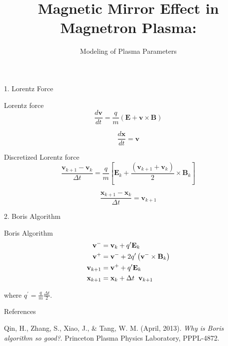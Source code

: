 \documentclass{beamer}
\title[]{Magnetic Mirror Effect in Magnetron Plasma:}
\subtitle{Modeling of Plasma Parameters}
\begin{document}
	
	\begin{frame}
		\titlepage	
	\end{frame}	
	
	\begin{frame}[t]{1. Lorentz Force }
	
	\begin{block}{Lorentz force}
		\begin{equation}
			\label{eqn:lorentz}
			\frac{d \textbf{v}}{d t} = \frac{q}{m} \left(\textbf{E} + \textbf{v} \times \textbf{B} \right)
		\end{equation}
	
	\end{block}
		\begin{equation}
			\label{eqn:velocity}
			\frac{d \textbf{x}}{d t} = \textbf{v}
		\end{equation}
	
	\begin{block}{Discretized Lorentz force}
		\begin{equation}
			\label{eqn:Dlorentz}
			\frac{\textbf{v}_{k+1} - \textbf{v}_{k}}{\Delta t} = \frac{q}{m} \left[\textbf{E}_{k} + \frac{\left( \textbf{v}_{k+1} + \textbf{v}_{k} \right) }{2} \times \textbf{B}_{k} \right] 
		\end{equation}
	\end{block}

	\begin{equation}
		\label{eqn:Dvelocity}
		\frac{\textbf{x}_{k+1} - \textbf{x}_{k} }{\Delta t} =	\textbf{v}_{k+1}
	\end{equation}

	\end{frame}
	
	\begin{frame}[t]{2. Boris Algorithm}
		\begin{block}{Boris Algorithm}
			\begin{equation}
				\begin{split}
					\textbf{v}^{-} & = \textbf{v}_{k} + q^{\prime} \textbf{E}_{k} \\
					\textbf{v}^{+} & = \textbf{v}^{-} + 2 q^{\prime} \left( \textbf{v}^{-} \times \textbf{B}_{k} \right) \\
					\textbf{v}_{k+1} & = \textbf{v}^{+} + q^{\prime} \textbf{E}_{k} \\
					\textbf{x}_{k+1} & = \textbf{x}_{k} + \Delta t \hspace{0.2cm}\textbf{v}_{k+1}
				\end{split}
			\end{equation}
		\end{block}
		
		where $q^{\prime} = \frac{\displaystyle q}{\displaystyle m} \frac{\displaystyle \Delta t}{ 2}$.
	\end{frame}

	\begin{frame}[t]{References}
	\begin{thebibliography}{}
		\bibitem{Borisgood}
		Qin, H., Zhang, S., Xiao, J., $\&$ Tang, W. M. (April, 2013). \textit{Why is Boris algorithm so good?}. Princeton Plasma Physics Laboratory, PPPL-4872.
		
	\end{thebibliography}
	\end{frame}
\end{document}
